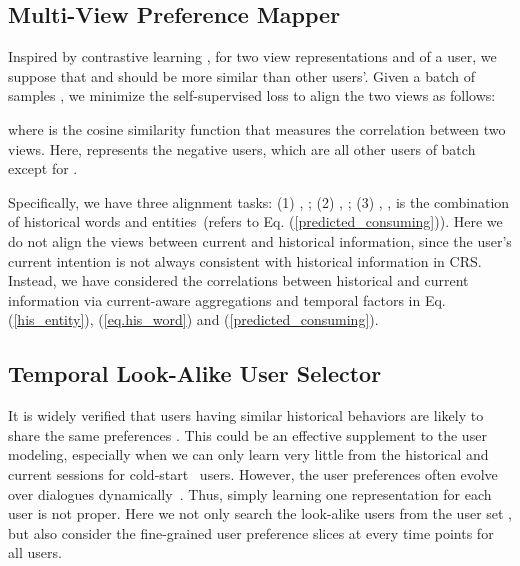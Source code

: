 \documentclass[sigconf,natbib=true]{acmart}
\begin{document}
\subsection{Multi-View Preference Mapper}
\label{multi_view_align}

Inspired by contrastive learning \cite{oord2018representation}, for two view representations  and  of a user, we suppose that  and  should be more similar than other users'. Given a batch of samples , we minimize the self-supervised loss to align the two views as follows:

where  is the cosine similarity function that measures the correlation between two views. Here,  represents the negative users, which are all other users of batch  except for .

Specifically, we have three alignment tasks: (1) , ; (2) , ; (3) , ,  is the combination of historical words and entities~(refers to Eq. (\ref{predicted_consuming})).
Here we do not align the views between current and historical information,
since the user's current intention is not always consistent with historical information in CRS. Instead, we have considered the correlations between historical and current information via current-aware aggregations and temporal factors in Eq. (\ref{his_entity}), (\ref{eq.his_word}) and (\ref{predicted_consuming}).




\subsection{Temporal Look-Alike User Selector}
\label{temp_look_alike_u_sel}

It is widely verified that users having similar historical behaviors are likely to share the same preferences \cite{zhao2010user}. This could be an effective supplement to the user modeling, especially when we can only learn very little from the historical and current sessions for cold-start~\cite{zhu2021learning,pan2019warm,zhu2021transfer,zhu2022personalized} users.
However, the user preferences often evolve over dialogues dynamically~\cite{zhou2019deep}. Thus, simply learning one representation for each user is not proper. Here we not only search the look-alike users from the user set , but also consider the fine-grained user preference slices at every time points for all users.
\end{document}
